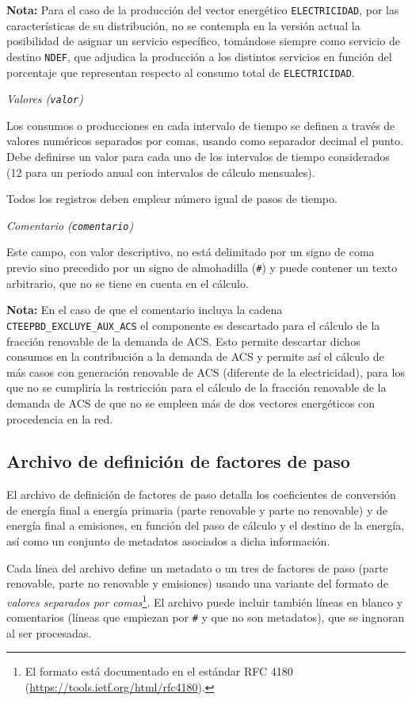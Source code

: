 \documentclass[10pt,notitlepage,oneside,a4paper]{article}
\begin{document}
\textbf{Nota:} Para el caso de la producción del vector energético \texttt{ELECTRICIDAD}, por las características de su distribución, no se contempla en la versión actual la posibilidad de asignar un servicio específico, tomándose siempre como servicio de destino \texttt{NDEF}, que adjudica la producción a los distintos servicios en función del porcentaje que representan respecto al consumo total de \texttt{ELECTRICIDAD}.

\textit{Valores (\texttt{valor})}

Los consumos o producciones en cada intervalo de tiempo se definen a través de valores numéricos separados por comas, usando como separador decimal el punto. Debe definirse un valor para cada uno de los intervalos de tiempo considerados (12 para un periodo anual con intervalos de cálculo mensuales).

Todos los registros deben emplear número igual de pasos de tiempo.

\textit{Comentario (\texttt{comentario})}

Este campo, con valor descriptivo, no está delimitado por un signo de coma previo sino precedido por un signo de almohadilla (\texttt{\#}) y puede contener un texto arbitrario, que no se tiene en cuenta en el cálculo.

\textbf{Nota:} En el caso de que el comentario incluya la cadena \texttt{CTEEPBD\_EXCLUYE\_AUX\_ACS} el componente es descartado para el cálculo de la fracción renovable de la demanda de ACS. Esto permite descartar dichos consumos en la contribución a la demanda de ACS y permite así el cálculo de más casos con generación renovable de ACS (diferente de la electricidad), para los que no se cumpliría la restricción para el cálculo de la fracción renovable de la demanda de ACS de que no se empleen más de dos vectores energéticos con procedencia en la red.

\clearpage
\newpage
\subsection{Archivo de definición de factores de paso}\label{sec:formatofactorespaso}

El archivo de definición de factores de paso detalla los coeficientes de conversión de energía final a energía primaria (parte renovable  y parte no renovable) y de energía final a emisiones, en función del paso de cálculo y el destino de la energía, así como un conjunto de metadatos asociados a dicha información.

Cada línea del archivo define un metadato o un tres de factores de paso (parte renovable, parte no renovable y emisiones) usando una variante del formato de \textit{valores separados por comas}\footnote{El formato está documentado en el estándar RFC 4180 (\url{https://tools.ietf.org/html/rfc4180}).}. El archivo puede incluir también líneas en blanco y comentarios (líneas que empiezan por \texttt{\#} y que no son metadatos), que se ingnoran al ser procesadas.
\end{document}
